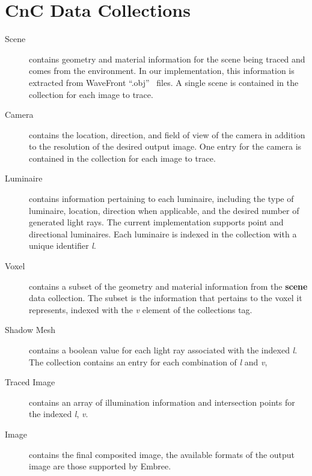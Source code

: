 \section{CnC Data Collections}
\label{sec:data-collections}
\begin{description}
\item[Scene] contains geometry and material information
for the scene being traced and comes from the environment.  In our 
implementation, this information is extracted from WaveFront
``.obj''~\cite{manual-wavefront} files.  A single scene is contained in the
collection for each image to trace.
\item[Camera] contains the location, direction, and field 
of view of the camera in addition to the resolution of the desired output image.
One entry for the camera is contained in the collection for each image to 
trace.
\item[Luminaire] contains information pertaining to each luminaire, including
the type of luminaire, location, direction when applicable, and the desired
number of generated light rays.  The current implementation supports point
and directional luminaires.  Each luminaire is indexed in the collection with a
unique identifier \emph{l}.
\item[Voxel] contains a subset of the geometry and 
material information from the \textbf{scene} data collection.  The subset is 
the information that pertains to the voxel it represents, indexed with the 
\emph{v} element of the collections tag.
\item[Shadow Mesh]contains a boolean value for each 
light ray associated with the indexed \emph{l}.  The collection contains an 
entry for each combination of \emph{l} and \emph{v}, 
\item[Traced Image] contains an array of illumination information and
intersection points for the indexed \emph{l}, \emph{v}.
\item[Image] contains the final composited image, the 
available formats of the output image are those supported by Embree. 
\end{description}

